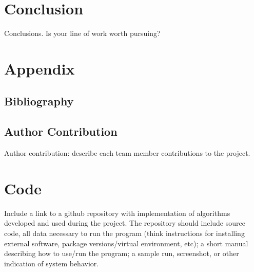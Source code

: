\documentclass{article}
\begin{document}
\section*{Conclusion}
Conclusions. Is your line of work worth pursuing?

\newpage
\appendix
\section*{Appendix}


\subsection*{Bibliography}




\subsection*{Author Contribution}
Author contribution: describe each team member contributions to the project.


\section{Code}
Include a link to a github repository with implementation of algorithms developed and used during the project. The repository should include
source code,
all data necessary to run the program (think instructions for installing external software, package versions/virtual environment, etc);
a short manual describing how to use/run the program;
a sample run, screenshot, or other indication of system behavior.
\end{document}
